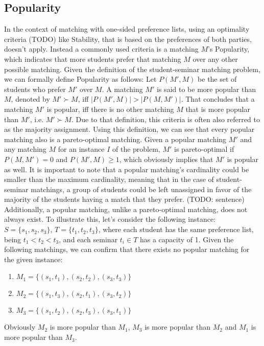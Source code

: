 \subsection{Popularity}
In the context of matching with one-sided preference lists, using an optimality criteria (TODO) like Stability, that is based on the preferences of both parties, doesn't apply. Instead a commonly used criteria is a matching $M$'s Popularity, which indicates that more students prefer that matching $M$ over any other possible matching.\cite{ManlovePopularMatchings} Given the definition of the student-seminar matching problem, we can formally define Popularity as follows:
Let $P(M', M)$ be the set of students who prefer $M'$ over $M$. A matching $M'$ is said to be more popular than $M$, denoted by $M' \succ M$, iff $|P(M', M)| > |P(M, M')|$. That concludes that a matching $M'$ is popular, iff there is no other matching $M$ that is more popular than $M'$, i.e. $M' \succ M$.\cite{Klaus, AbrahamPopular} Due to that definition, this criteria is often also referred to as the majority assignment.\cite{Gardenfors}
\newline
Using this definition, we can see that every popular matching also is a pareto-optimal matching. Given a popular matching $M'$ and any matching $M$ for an instance $I$ of the problem, $M'$ is pareto-optimal if $P(M, M') = 0$ and $P(M', M) \geq 1$, which obviously implies that $M'$ is popular as well.\cite{Klaus}
\newline
It is important to note that a popular matching's cardinality could be smaller than the maximum cardinality, meaning that in the case of student-seminar matchings, a group of students could be left unassigned in favor of the majority of the students having a match that they prefer. (TODO: sentence)
Additionally, a popular matching, unlike a pareto-optimal matching, does not always exist. To illustrate this, let's consider the following instance: $S=\{s_1, s_2, s_3\}$, $T=\{t_1, t_2, t_3\}$, where each student has the same preference list, being $t_1 < t_2 < t_3$, and each seminar $t_i \in T$ has a capacity of 1. Given the following matchings, we can confirm that there exists no popular matching for the given instance: 
\begin{enumerate}
    \item $M_1=\{(s_1, t_1), (s_2, t_2), (s_3, t_3)\}$
    \item $M_2=\{(s_1, t_3), (s_2, t_1), (s_3, t_2)\}$
    \item $M_3=\{(s_1, t_2), (s_2, t_3), (s_3, t_1)\}$
\end{enumerate}
Obviously $M_2$ is more popular than $M_1$, $M_3$ is more popular than $M_2$ and $M_1$ is more popular than $M_3$.\cite{AbrahamPopular}

